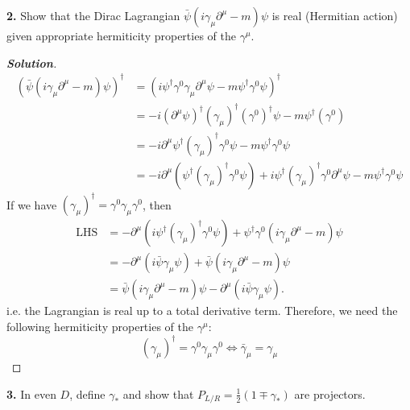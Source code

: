 \documentclass[11pt]{article}
\newenvironment{solution}[1][]{\begin{proof}[\textbf{Solution}]}{\end{proof}}
\begin{document}
\begin{tcolorbox}[problem]
\textbf{2.} Show that the Dirac Lagrangian $\bar\psi(i\gamma_\mu\partial^\mu-m)\psi$ is real (Hermitian action) given appropriate hermiticity properties of the $\gamma^\mu$.
\end{tcolorbox}
\begin{solution}[13.2]
	$$
	\begin{aligned}\left(\bar{\psi}\left(i\gamma_\mu\partial^\mu-m\right)\psi\right)^\dagger&=\left(i\left.\psi^\dagger\gamma^0\gamma_\mu\partial^\mu\psi-m\right.\psi^\dagger\gamma^0\psi\right)^{\dagger}\\&=-i\left(\partial^\mu\psi\right)^\dagger(\gamma_\mu)^\dagger(\gamma^0)^\dagger\psi-m\psi^\dagger(\gamma^0)\\&=-i\left.\partial^{\mu}\psi^{\dagger}(\gamma_{\mu})^{\dagger}\gamma^{0}\psi\right.-\left.m\psi^{\dagger}\gamma^{0}\psi\right.\\&=-i\partial^\mu\left(\psi^\dagger(\gamma_\mu)^\dagger\gamma^0\psi\right)+i\psi^\dagger(\gamma_\mu)^\dagger\gamma^0\partial^\mu\psi-m\psi^\dagger\gamma^0\psi
\end{aligned}
$$
		If we have $(\gamma_\mu)^\dagger=\gamma^0\gamma_\mu\gamma^0$, then
	$$
		\begin{aligned}
		\text{LHS}&=-\partial^{\mu}{\left(i\left.\psi^{\dagger}(\gamma_{\mu})^{\dagger}\gamma^{0}\psi\right)\right.}+\left.\psi^{\dagger}\gamma^{0}(i\gamma_{\mu}\partial^{\mu}-m)\psi\right.\\&=-\partial^\mu\left(i\bar{\psi}\gamma_\mu\psi\right)+\bar{\psi}(i\gamma_\mu\partial^\mu-m)\psi\\&=\bar{\psi}\left(i\gamma_\mu\partial^\mu-m\right)\psi-\partial^\mu\left(i\bar{\psi}\gamma_\mu\psi\right).\end{aligned}
	$$
	i.e. the Lagrangian is real up to a total derivative term. Therefore, we need the following hermiticity properties of the $\gamma^\mu$:
	$$
	\boxed{
	(\gamma_\mu)^\dagger=\gamma^0\gamma_\mu\gamma^0\iff\bar{\gamma}_\mu=\gamma_\mu	}
	$$
\end{solution}
\begin{tcolorbox}[problem]
\textbf{3.} In even $D$, define $\gamma_\ast$ and show that $P_{L/R}=\frac12(1\mp\gamma_\ast)$ are projectors.
\end{tcolorbox}
\end{document}
